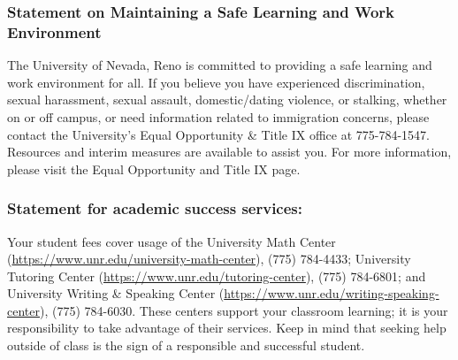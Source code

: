 \documentclass[
]{article}
\begin{document}
\hypertarget{statement-on-maintaining-a-safe-learning-and-work-environment}{%
\subsubsection{Statement on Maintaining a Safe Learning and Work
Environment}\label{statement-on-maintaining-a-safe-learning-and-work-environment}}

The University of Nevada, Reno is committed to providing a safe learning
and work environment for all. If you believe you have experienced
discrimination, sexual harassment, sexual assault, domestic/dating
violence, or stalking, whether on or off campus, or need information
related to immigration concerns, please contact the University's Equal
Opportunity \& Title IX office at 775-784-1547. Resources and interim
measures are available to assist you. For more information, please visit
the Equal Opportunity and Title IX page.

\hypertarget{statement-for-academic-success-services}{%
\subsubsection{Statement for academic success
services:}\label{statement-for-academic-success-services}}

Your student fees cover usage of the University Math Center
(\url{https://www.unr.edu/university-math-center}), (775) 784-4433;
University Tutoring Center (\url{https://www.unr.edu/tutoring-center}),
(775) 784-6801; and University Writing \& Speaking Center
(\url{https://www.unr.edu/writing-speaking-center}), (775) 784-6030.
These centers support your classroom learning; it is your responsibility
to take advantage of their services. Keep in mind that seeking help
outside of class is the sign of a responsible and successful student.
\end{document}
